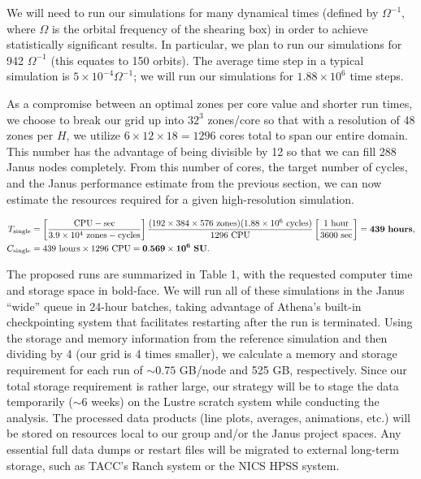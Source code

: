 \documentclass[preprint]{aastex}
\begin{document}
We will need to run our simulations for many dynamical times (defined by $\Omega^{-1}$, where $\Omega$ is the orbital frequency of the shearing box) in order to achieve statistically significant results.  In particular, we plan to run our simulations for 942 $\Omega^{-1}$ (this equates to 150 orbits).  The average time step in a typical simulation is $5\times10^{-4}\Omega^{-1}$; we will run our simulations for $1.88\times10^6$ time steps. 

As a compromise between an optimal zones per core value and shorter run times, we choose to break our grid up into $32^3$ zones/core so that with a resolution of 48 zones per $H$, we utilize $6 \times 12 \times 18 = 1296$ cores total to span our entire domain.
This number has the advantage of being divisible by 12 so that we can fill 288 {\sc Janus} nodes completely. From this number of cores, the target number of cycles, and the {\sc Janus} performance estimate from the previous section, we can now estimate the resources required for a given high-resolution simulation.

\begin{align*}
T_{\rm single} &=\left[\frac{\rm CPU-sec}{3.9 \times 10^4~{\rm zones-cycles}}\right]\frac{(192\times384\times576~{\rm zones}) (1.88 \times 10^6~{\rm cycles})}{1296~{\rm CPU}}\left[\frac{1~{\rm hour}}{3600~{\rm sec}}\right]
           = \mathbf{439}~{\rm \bf hours}, \\
C_{\rm single} &=439~{\rm hours}\times1296~{\rm CPU}=\mathbf{0.569 \times 10^6~{\rm \bf SU}}.
\end{align*}

The proposed runs are summarized in Table 1, with the requested computer time and storage space in bold-face.
We will run all of these simulations in the {\sc Janus} ``wide'' queue in 24-hour batches, taking advantage of {\sc Athena}'s built-in checkpointing system that facilitates restarting after the run is terminated.
Using the storage and memory information from the reference simulation and then dividing by 4 (our grid is 4 times smaller), we calculate a memory and storage requirement for each run of $\sim 0.75$ GB/node and 525 GB, respectively.
Since our total storage requirement is rather large, our strategy will be to stage the data temporarily ($\sim 6$ weeks) on the Lustre scratch system while conducting the analysis. The processed data products (line plots, averages, animations, etc.) will be stored on resources local to our group and/or the {\sc Janus} project spaces. Any essential full data dumps or restart files will be migrated to external long-term storage, such as TACC's {\sc Ranch} system or the NICS HPSS system.
\end{document}

